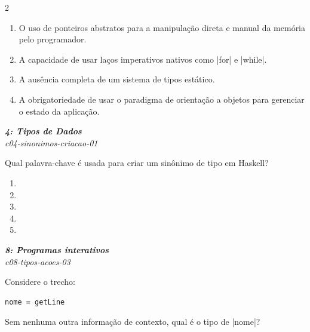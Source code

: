 \documentclass[a4paper,10pt,brazil]{article}
\begin{document}
\begin{multicols}{2}
\begin{enumerate}
  \item O uso de ponteiros abstratos para a manipulação direta e manual da memória pelo programador.

  \item A capacidade de usar laços imperativos nativos como \cinline|for| e \cinline|while|.

  \item A ausência completa de um sistema de tipos estático.

  \item A obrigatoriedade de usar o paradigma de orientação a objetos para gerenciar o estado da aplicação.


\end{enumerate}

\begin{flushright}
  \footnotesize
  \textit{\textbf{4: Tipos de Dados}}\\
  \textit{c04-sinonimos-criacao-01}\\

\end{flushright}
Qual palavra-chave é usada para criar um sinônimo de tipo em Haskell?

\begin{enumerate}
  \item {}

  \item {}

  \item {}

  \item {}

  \item {}


\end{enumerate}

\begin{flushright}
  \footnotesize
  \textit{\textbf{8: Programas interativos}}\\
  \textit{c08-tipos-acoes-03}\\

\end{flushright}
Considere o trecho:

\begin{verbatim}
nome = getLine
\end{verbatim}

Sem nenhuma outra informação de contexto, qual é o tipo de \haskellinline|nome|?


\end{multicols}
\end{document}
